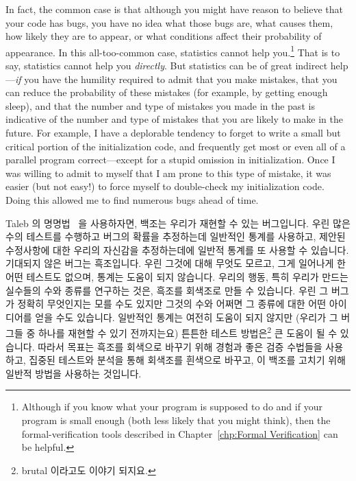 In fact, the common case is that although you might have reason to believe
that your code has bugs, you have no idea what those bugs are, what
causes them, how likely they are to appear, or what conditions affect
their probability of appearance.
In this all-too-common case, statistics cannot help you.\footnote{
	Although if you know what your program is supposed to do and
	if your program is small enough (both less likely that you
	might think), then the formal-verification tools described in
	Chapter~\ref{chp:Formal Verification}
	can be helpful.}
That is to say, statistics cannot help you \emph{directly}.
But statistics can be of great indirect help---\emph{if} you have the
humility required to admit that you make mistakes, that you can reduce the
probability of these mistakes (for example, by getting enough sleep), and
that the number and type of mistakes you made in the past is indicative of
the number and type of mistakes that you are likely to make in the future.
For example, I have a deplorable tendency to forget to write a small
but critical portion of the initialization code, and frequently get most
or even all of a parallel program correct---except for a stupid
omission in initialization.
Once I was willing to admit to myself that I am prone to this type of
mistake, it was easier (but not easy!) to force myself to double-check
my initialization code.
Doing this allowed me to find numerous bugs ahead of time.

\fi

Taleb 의 명명법~\cite{NassimTaleb2007BlackSwan} 을 사용하자면, 백조는 우리가
재현할 수 있는 버그입니다.
우린 많은 수의 테스트를 수행하고 버그의 확률을 추정하는데 일반적인 통계를
사용하고, 제안된 수정사항에 대한 우리의 자신감을 추정하는데에 일반적 통계를 또
사용할 수 있습니다.
기대되지 않은 버그는 흑조입니다.
우린 그것에 대해 무엇도 모르고, 그게 일어나게 한 어떤 테스트도 없으며, 통계는
도움이 되지 않습니다.
우리의 행동, 특히 우리가 만드는 실수들의 수와 종류를 연구하는 것은, 흑조를
회색조로 만들 수 있습니다.
우린 그 버그가 정확히 무엇인지는 모를 수도 있지만 그것의 수와 어쩌면 그 종류에
대한 어떤 아이디어를 얻을 수도 있습니다.
일반적인 통계는 여전히 도움이 되지 않지만 (우리가 그 버그들 중 하나를 재현할 수
있기 전까지는요) 튼튼한 테스트 방법은\footnote{
	brutal 이라고도 이야기 되지요.}
큰 도움이 될 수 있습니다.
따라서 목표는 흑조를 회색으로 바꾸기 위해 경험과 좋은 검증 수법들을 사용하고,
집중된 테스트와 분석을 통해 회색조를 흰색으로 바꾸고, 이 백조를 고치기 위해
일반적 방법을 사용하는 것입니다.

\iffalse

